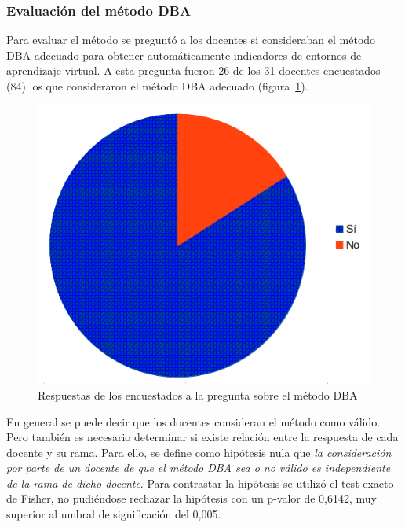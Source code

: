 \subsubsection{Evaluación del método DBA}

Para evaluar el método se preguntó a los docentes si consideraban el método DBA adecuado para obtener automáticamente indicadores de entornos de aprendizaje virtual. A esta pregunta fueron 26 de los 31 docentes encuestados (84\percentage) los que consideraron el método DBA adecuado (figura~\ref{fig:cap:encuesta:metodoDBA}).


\begin{figure}
  \begin{center}
    \includegraphics[scale=0.4]{EncuestaMetodoDBA.png}
  \end{center}
  \caption{Respuestas de los encuestados a la pregunta sobre el método DBA}
  \label{fig:cap:encuesta:metodoDBA}
\end{figure}

En general se puede decir que los docentes consideran el método como válido. Pero también es necesario determinar si existe relación entre la respuesta de cada docente y su rama. Para ello, se define como hipótesis nula que \emph{la consideración por parte de un docente de que el método DBA sea o no válido es independiente de la rama de dicho docente}. Para contrastar la hipótesis se utilizó el test exacto de Fisher, no pudiéndose rechazar la hipótesis con un p-valor de 0,6142, muy superior al umbral de significación del 0,005.

